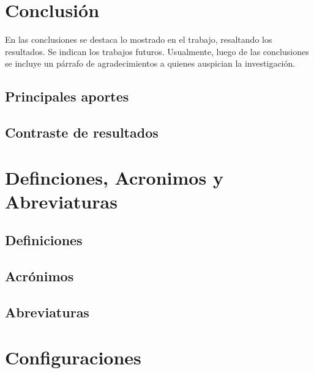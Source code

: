 \documentclass[letter,12pt]{report}
\begin{document}
\chapter{Conclusión}\label{conclusion}
En las conclusiones se destaca lo mostrado en el trabajo, resaltando los resultados. Se indican los trabajos futuros. Usualmente, luego de las conclusiones se incluye un párrafo de agradecimientos a quienes auspician la investigación.
\section{Principales aportes}
\section{Contraste de resultados}

\renewcommand{\refname}{Referencias}



\renewcommand{\appendixname}{Anexos}
\appendix

\chapter{Definciones, Acronimos y Abreviaturas}\label{definiciones}
\section{Definiciones}
\section{Acrónimos}
\section{Abreviaturas}

\chapter{Configuraciones}\label{configuracion}
\blindtext %
\end{document}

